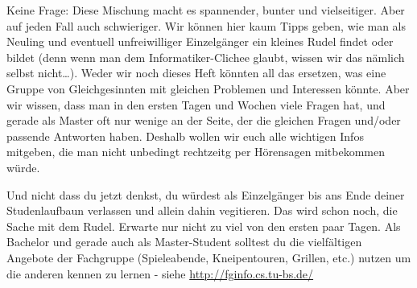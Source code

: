 Keine Frage: Diese Mischung macht es spannender, bunter und vielseitiger. Aber auf jeden Fall auch schwieriger. Wir können hier kaum Tipps geben, wie man als Neuling und eventuell unfreiwilliger Einzelgänger ein kleines Rudel findet oder bildet (denn wenn man dem Informatiker-Clichee glaubt, wissen wir das nämlich selbst nicht\ldots). Weder wir noch dieses Heft könnten all das ersetzen, was eine Gruppe von Gleichgesinnten mit gleichen Problemen und Interessen könnte. Aber wir wissen, dass man in den ersten Tagen und Wochen viele Fragen hat, und gerade als Master oft nur wenige an der Seite, der die gleichen Fragen und/oder passende Antworten haben. Deshalb wollen wir euch alle wichtigen Infos mitgeben, die man nicht unbedingt rechtzeitg per Hörensagen mitbekommen würde.

Und nicht dass du jetzt denkst, du würdest als Einzelgänger bis ans
Ende deiner Studenlaufbaun verlassen und allein dahin vegitieren. Das
wird schon noch, die Sache mit dem Rudel. Erwarte nur nicht zu viel
von den ersten paar Tagen. Als Bachelor und gerade auch als
Master-Student solltest du die vielfältigen Angebote der Fachgruppe
(Spieleabende, Kneipentouren, Grillen, etc.) nutzen um die anderen
kennen zu lernen - siehe \url{http://fginfo.cs.tu-bs.de/}
